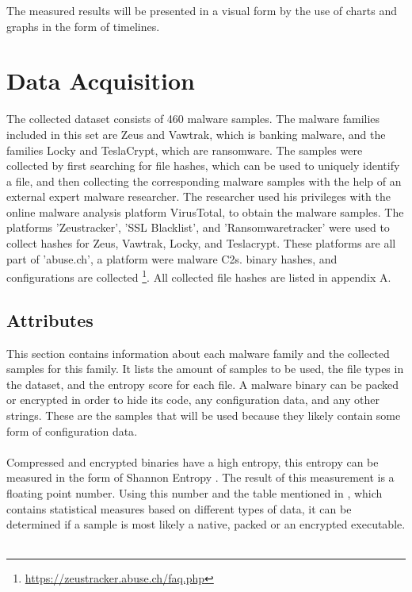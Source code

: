 \documentclass[conference]{IEEEtran}
\begin{document}
The measured results will be presented in a visual form by the use of charts and graphs in the form of timelines.


\section{Data Acquisition}

The collected dataset consists of 460 malware samples. The malware families included in this set are Zeus and Vawtrak, which is banking malware, and the families Locky and TeslaCrypt, which are ransomware.  The samples were collected  by first searching for file hashes, which can be used to uniquely identify a file,  and then collecting the corresponding malware samples with the help of an external expert malware researcher. The researcher used his privileges with the online malware analysis platform VirusTotal, to obtain the malware samples. The platforms 'Zeustracker', 'SSL Blacklist', and 'Ransomwaretracker' were used to collect hashes for Zeus, Vawtrak, Locky, and Teslacrypt. These platforms are all part of 'abuse.ch', a platform were malware \Gls{C2}s. binary hashes, and configurations are collected \footnote{\url{https://zeustracker.abuse.ch/faq.php}}. All collected file hashes are listed in appendix A.

\subsection{Attributes}	
This section contains information about each malware family and the collected samples for this family. It lists the amount of samples to be used, the file types in the dataset, and the entropy score for each file. A malware binary can be packed or encrypted in order to hide its code, any \Gls{configuration data}, and any other strings. These are the samples that will be used because they likely contain some form of \Gls{configuration data}. \\\\Compressed and encrypted binaries have a high entropy, this entropy can be measured in the form of Shannon Entropy \cite{hamrock-entropy}. The result of this measurement is a floating point number. Using this number and the table mentioned in \cite{hamrock-entropy}, which contains statistical measures based on different types of data, it can be determined if a sample is most likely a native, packed or an encrypted executable.
\\\\
\end{document}
